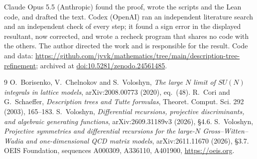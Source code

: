 \documentclass[11pt]{amsart}
\theoremstyle{remark}
\begin{document}
Claude Opus 5.5 (Anthropic) found the proof, wrote the scripts and the Lean code, and drafted the text. Codex
(OpenAI) ran an independent literature search and an independent check of every step; it found a sign error in the
displayed resultant, now corrected, and wrote a recheck program that shares no code with the others. The author
directed the work and is responsible for the result. Code and data:
\url{https://github.com/jvvk/mathematics/tree/main/description-tree-refinement}; archived at
\href{https://doi.org/10.5281/zenodo.24561485}{doi:10.5281/zenodo.24561485}.

\begin{thebibliography}{9}
 O.~Borisenko, V.~Chelnokov and S.~Voloshyn, \emph{The large $N$ limit of $SU(N)$ integrals in lattice
models}, arXiv:2008.00773 (2020), eq.~(48).
 R.~Cori and G.~Schaeffer, \emph{Description trees and Tutte formulas}, Theoret. Comput. Sci. 292 (2003),
165--183.
 S.~Voloshyn, \emph{Differential recursions, projective discriminants, and algebraic generating
functions}, arXiv:2609.31189v3 (2026), \S4.6.
 S.~Voloshyn, \emph{Projective symmetries and differential recursions for the large-$N$
Gross--Witten--Wadia and one-dimensional QCD matrix models}, arXiv:2611.11670 (2026), \S3.7.
 OEIS Foundation, sequences A000309, A336110, A401900, \url{https://oeis.org}.
\end{thebibliography}
\end{document}
